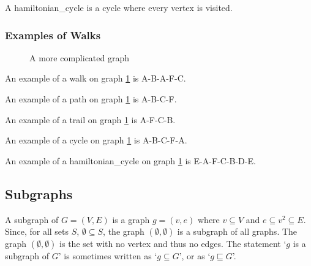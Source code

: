         A \gls{hamiltonian_cycle} is a \gls{cycle} where every \gls{vertex} is visited.

        \subsubsection{Examples of Walks}
            \begin{figure}
                \centering
                \caption{A more complicated \gls{graph}}
                \label{fig:demo_graph}
            \end{figure}

            An example of a \gls{walk} on \gls{graph} \ref{fig:demo_graph} is A-B-A-F-C.

            An example of a \gls{path} on \gls{graph} \ref{fig:demo_graph} is A-B-C-F.

            An example of a \gls{trail} on \gls{graph} \ref{fig:demo_graph} is A-F-C-B.

            An example of a \gls{cycle} on \gls{graph} \ref{fig:demo_graph} is A-B-C-F-A.

            An example of a \gls{hamiltonian_cycle} on \gls{graph} \ref{fig:demo_graph} is E-A-F-C-B-D-E.

    \subsection{Subgraphs}
        A \gls{subgraph} of $G=(V,E)$ is a \gls{graph} $g=(v,e)$ where $v\subseteq V$ and $e\subseteq v^2\subseteq E$.
        Since, for all sets $S$, $\emptyset\subseteq S$, the \gls{graph} $(\emptyset,\emptyset)$ is a \gls{subgraph} of all \glspl{graph}.
        The \gls{graph} $(\emptyset,\emptyset)$ is the set with no \gls{vertex} and thus no \glspl{edge}.
        The statement `$g$ is a \gls{subgraph} of $G$' is sometimes written as `$g\subseteq G$', or as `$g\sqsubseteq G$'.

